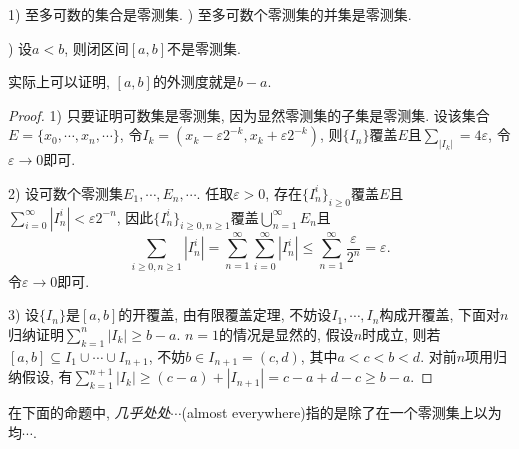 \begin{lemma}{}
	1) 至多可数的集合是零测集. ) 至多可数个零测集的并集是零测集. 
	
	) 设$a<b$, 则闭区间$[a,b]$不是零测集. 
\end{lemma}
\begin{remark}
	实际上可以证明, $[a,b]$的外测度就是$b-a$. 
\end{remark}
\begin{proof}
	1) 只要证明可数集是零测集, 因为显然零测集的子集是零测集. 设该集合$E=\{ x_0,\cdots ,x_n,\cdots \}$, 令$I_k=(x_k-\varepsilon 2^{-k},x_k+\varepsilon 2^{-k})$, 则$\{ I_n \}$覆盖$E$且$\sum_{|I_k|} = 4\varepsilon$, 令$\varepsilon \to 0$即可.
	
	2) 设可数个零测集$E_1,\cdots ,E_n,\cdots$. 任取$\varepsilon >0$, 存在$\{ I_n^i \}_{i \geq 0}$覆盖$E$且$\sum_{i=0}^{\infty} |I_n^i| < \varepsilon 2^{-n}$, 因此$\{ I_n^i \}_{i\geq 0,n\geq 1}$覆盖$\bigcup_{n=1}^{\infty} E_n$且$$\sum_{i\geq 0,n\geq 1}|I_n^i| = \sum_{n=1}^{\infty} \sum_{i=0}^{\infty} |I_n^i| \leq \sum_{n=1}^{\infty} \frac{\varepsilon}{2^n} = \varepsilon .$$
	令$\varepsilon \to 0$即可. 
	
	3) 设$\{ I_n \}$是$[a,b]$的开覆盖, 由有限覆盖定理, 不妨设$I_1,\cdots ,I_n$构成开覆盖, 下面对$n$归纳证明$\sum_{k=1}^{n} |I_k| \geq b-a$. $n=1$的情况是显然的, 假设$n$时成立, 则若$[a,b] \subseteq I_1 \cup \cdots \cup I_{n+1}$, 不妨$b \in I_{n+1} = (c,d)$, 其中$a<c<b<d$. 对前$n$项用归纳假设, 有$\sum_{k=1}^{n+1} |I_k| \geq (c-a)+|I_{n+1}| = c-a+d-c \geq b-a$. 
\end{proof}

在下面的命题中, \textit{几乎处处$\cdots$}(almost everywhere)指的是除了在一个零测集上以为均$\cdots$. 

